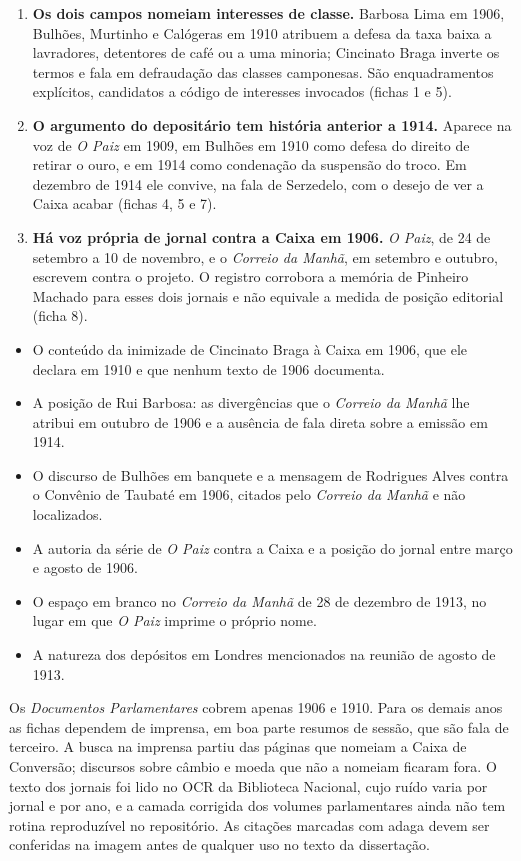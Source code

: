 \begin{enumerate}[leftmargin=*]
\item \textbf{Os dois campos nomeiam interesses de classe.} Barbosa Lima em
1906, Bulhões, Murtinho e Calógeras em 1910 atribuem a defesa da taxa baixa a
lavradores, detentores de café ou a uma minoria; Cincinato Braga inverte os
termos e fala em defraudação das classes camponesas. São enquadramentos
explícitos, candidatos a código de interesses invocados (fichas 1 e 5).

\item \textbf{O argumento do depositário tem história anterior a 1914.}
Aparece na voz de \textit{O Paiz} em 1909, em Bulhões em 1910 como defesa do
direito de retirar o ouro, e em 1914 como condenação da suspensão do troco. Em
dezembro de 1914 ele convive, na fala de Serzedelo, com o desejo de ver a
Caixa acabar (fichas 4, 5 e 7).

\item \textbf{Há voz própria de jornal contra a Caixa em 1906.} \textit{O
Paiz}, de 24 de setembro a 10 de novembro, e o \textit{Correio da Manhã}, em
setembro e outubro, escrevem contra o projeto. O registro corrobora a memória
de Pinheiro Machado para esses dois jornais e não equivale a medida de posição
editorial (ficha 8).
\end{enumerate}


\begin{itemize}[leftmargin=*,nosep]
\item O conteúdo da inimizade de Cincinato Braga à Caixa em 1906, que ele
declara em 1910 e que nenhum texto de 1906 documenta.
\item A posição de Rui Barbosa: as divergências que o \textit{Correio da Manhã}
lhe atribui em outubro de 1906 e a ausência de fala direta sobre a emissão em
1914.
\item O discurso de Bulhões em banquete e a mensagem de Rodrigues Alves contra
o Convênio de Taubaté em 1906, citados pelo \textit{Correio da Manhã} e não
localizados.
\item A autoria da série de \textit{O Paiz} contra a Caixa e a posição do
jornal entre março e agosto de 1906.
\item O espaço em branco no \textit{Correio da Manhã} de 28 de dezembro de
1913, no lugar em que \textit{O Paiz} imprime o próprio nome.
\item A natureza dos depósitos em Londres mencionados na reunião de agosto de
1913.
\end{itemize}


Os \textit{Documentos Parlamentares} cobrem apenas 1906 e 1910. Para os demais
anos as fichas dependem de imprensa, em boa parte resumos de sessão, que são
fala de terceiro. A busca na imprensa partiu das páginas que nomeiam a Caixa de
Conversão; discursos sobre câmbio e moeda que não a nomeiam ficaram fora. O
texto dos jornais foi lido no OCR da Biblioteca Nacional, cujo ruído varia por
jornal e por ano, e a camada corrigida dos volumes parlamentares ainda não tem
rotina reproduzível no repositório. As citações marcadas com adaga devem ser
conferidas na imagem antes de qualquer uso no texto da dissertação.
